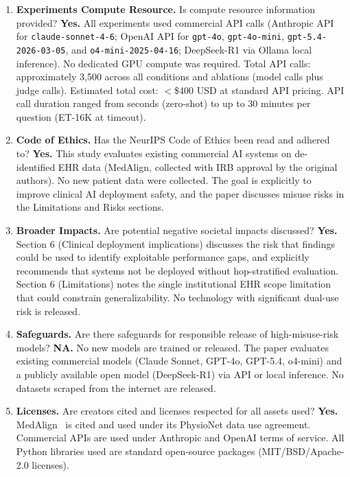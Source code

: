 \documentclass{article}
\begin{document}
\begin{enumerate}
\item \textbf{Experiments Compute Resource.}
Is compute resource information provided?
\textbf{Yes.} All experiments used commercial API calls (Anthropic API for
\texttt{claude-sonnet-4-6}; OpenAI API for \texttt{gpt-4o},
\texttt{gpt-4o-mini}, \texttt{gpt-5.4-2026-03-05}, and
\texttt{o4-mini-2025-04-16}; DeepSeek-R1 via Ollama local inference).
No dedicated GPU compute was required. Total API calls: approximately
3{,}500 across all conditions and ablations (model calls plus judge calls).
Estimated total cost: $<$\$400 USD at standard API pricing. API call
duration ranged from seconds (zero-shot) to up to 30 minutes per question
(ET-16K at timeout).

\item \textbf{Code of Ethics.}
Has the NeurIPS Code of Ethics been read and adhered to?
\textbf{Yes.} This study evaluates existing commercial AI systems on
de-identified EHR data (MedAlign, collected with IRB approval by the
original authors). No new patient data were collected. The goal is
explicitly to improve clinical AI deployment safety, and the paper
discusses misuse risks in the Limitations and Risks sections.

\item \textbf{Broader Impacts.}
Are potential negative societal impacts discussed?
\textbf{Yes.} Section 6 (Clinical deployment implications) discusses the
risk that findings could be used to identify exploitable performance gaps,
and explicitly recommends that systems not be deployed without
hop-stratified evaluation. Section 6 (Limitations) notes the single
institutional EHR scope limitation that could constrain generalizability.
No technology with significant dual-use risk is released.

\item \textbf{Safeguards.}
Are there safeguards for responsible release of high-misuse-risk models?
\textbf{NA.} No new models are trained or released. The paper evaluates
existing commercial models (Claude Sonnet, GPT-4o, GPT-5.4, o4-mini) and
a publicly available open model (DeepSeek-R1) via API or local inference.
No datasets scraped from the internet are released.

\item \textbf{Licenses.}
Are creators cited and licenses respected for all assets used?
\textbf{Yes.} MedAlign~\citep{wornow2024medalign} is cited and used under
its PhysioNet data use agreement. Commercial APIs are used under Anthropic
and OpenAI terms of service. All Python libraries used are standard
open-source packages (MIT/BSD/Apache-2.0 licenses).


\end{enumerate}
\end{document}

